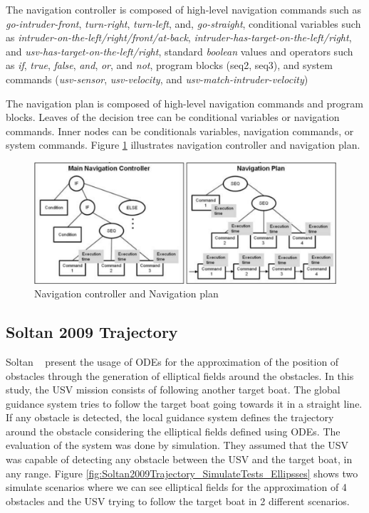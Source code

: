     The navigation controller is composed of high-level navigation commands such as \textit{go-intruder-front}, \textit{turn-right}, \textit{turn-left}, and, \textit{go-straight}, conditional variables such as \textit{intruder-on-the-left/right/front/at-back}, \textit{intruder-has-target-on-the-left/right}, and \textit{usv-has-target-on-the-left/right}, standard \textit{boolean} values and operators such as \textit{if}, \textit{true}, \textit{false}, \textit{and}, \textit{or}, and \textit{not}, program blocks (seq2, seq3), and system commands (\textit{usv-sensor}, \textit{usv-velocity}, and \textit{usv-match-intruder-velocity})
    
    The navigation plan is composed of high-level navigation commands and program blocks.
    Leaves of the decision tree can be conditional variables or navigation commands.
    Inner nodes can be conditionals variables, navigation commands, or system commands.
    Figure \ref{fig:Svec2012Automated_GuidancePlanning} illustrates navigation controller and navigation plan.
    
    \begin{figure}[H]
        \centering
        \includegraphics[scale=0.35]{figs/Chap3/Svec2012Automated_GuidancePlanning.png}
        \caption{Navigation controller and Navigation plan \cite{Svec2011aAutomated, Svec2012Automated}}
        \label{fig:Svec2012Automated_GuidancePlanning}
    \end{figure}
 
    \subsection{Soltan 2009 Trajectory}
    Soltan \etal~\cite{Soltan2009Trajectory} present the usage of \acp{ODE} for the approximation of the position of obstacles through the generation of elliptical fields around the obstacles. In this study, the \ac{USV} mission consists of following another target boat. The global guidance system tries to follow the target boat going towards it in a straight line. If any obstacle is detected, the local guidance system defines the trajectory around the obstacle considering the elliptical fields defined using \acp{ODE}. The evaluation of the system was done by simulation. They assumed that the \ac{USV} was capable of detecting any obstacle between the \ac{USV} and the target boat, in any range. Figure \ref{fig:Soltan2009Trajectory_SimulateTests_Ellipsses} shows two simulate scenarios where we can see elliptical fields for the approximation of 4 obstacles and the \ac{USV} trying to follow the target boat in 2 different scenarios.
    
